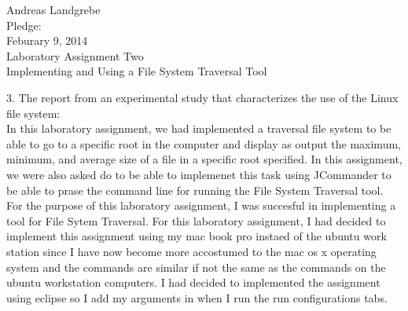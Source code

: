 \documentclass{article}
\begin{document}
\noindent
\begin{center}
\Huge Andreas Landgrebe
\\
Pledge:
\\
Feburary 9, 2014
\\
\Huge Laboratory Assignment Two
\\
\Huge Implementing and Using a File System Traversal Tool

\end{center}


\newpage

3. The report from an experimental study that characterizes the use of the Linux file system:
\\

In this laboratory assignment, we had implemented a traversal file system to be able to go to a specific root in the computer and display as output the maximum, minimum, and average size of a file in a specific root specified. In this assignment, we were also asked do to be able to implemenet this task using JCommander to be able to prase the command line for running the File System Traversal tool. For the purpose of this laboratory assignment, I was succesful in implementing a tool for File Sytem Traversal. For this laboratory assignment, I had decided to implement this assignment using my mac book pro instaed of the ubuntu work station since I have now become more accostumed to the mac os x operating system and the commands are similar if not the same as the commands on the ubuntu workstation computers. I had decided to implemented the assignment using eclipse  so I add my arguments in when I run the run configurations tabs.
\\
\end{document}
